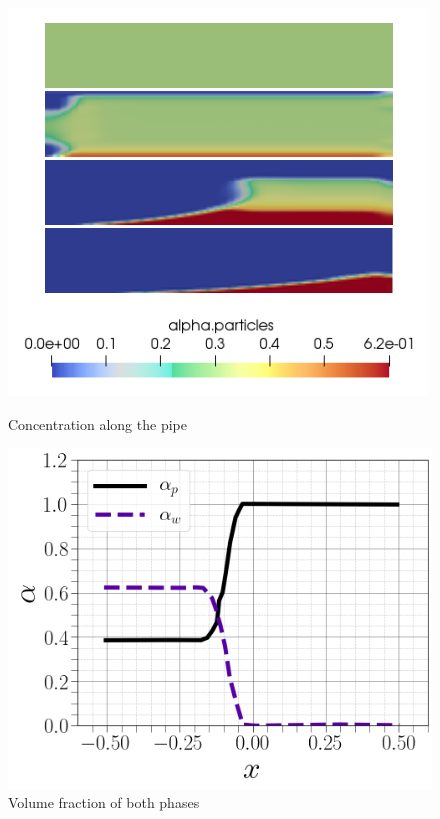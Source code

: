 \documentclass[11pt]{report}
\begin{document}
\begin{minipage}[t]{0.35\textwidth}
\begin{minipage}[t]{0.5\textwidth}
\begin{minipage}[t]{0.35\textwidth}
\begin{minipage}[t]{0.35\textwidth}
\begin{figure}[ht!]
\begin{center}
 \includegraphics[trim=0cm 0cm 0cm 0cm,clip,scale=0.72]{figs/6.png}
 {\caption{ \footnotesize Concentration along the pipe}}
 \label{fig:gauss}
 \end{center}
 \end{figure} 
%
 \begin{figure}[ht!]
 \begin{center}
 
 \includegraphics[trim=0cm 0cm 0cm 0cm,clip,scale=0.25]{figs/5.png}
 \caption{ \footnotesize { Volume fraction of both phases }}
 \label{fig:gauss}
 \end{center}
 \end{figure} 


\end{minipage}
\end{minipage}
\end{minipage}
\end{minipage}
\end{document}
